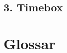 \documentclass[a4paper,12pt,twoside]{scrreprt}
\begin{document}
    \section{3. Timebox}
        

    \chapter{Glossar}
        


\end{document}
